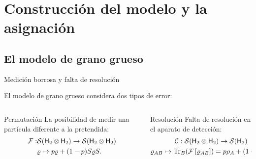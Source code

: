 \section{Construcción del modelo y la asignación}

\subsection{El modelo de grano grueso}
\begin{frame}{Medición borrosa y falta de resolución}
    \begin{center}
        El modelo de grano grueso considera dos tipos de error\pause:
    \end{center}
    \vspace{0.3cm}
    \begin{columns}
        \begin{column}{0.5\textwidth}
            \begin{block}{Permutación}
            \centering
            La posibilidad de medir una partícula diferente a la pretendida\pause:
            \begin{align}
                \mathcal{F}:&\mathcal{S}({\sf H}_2 \otimes {\sf H}_2)\to \mathcal{S}({\sf H}_2 \otimes {\sf H}_2)\nonumber\\
                &\varrho \mapsto p\varrho+(1-p)S\varrho S.\nonumber
            \end{align}
        \end{block}
        \end{column}
        \pause
        \begin{column}{0.5\textwidth}
            \begin{block}{Resolución}
            \centering
            Falta de resolución en el aparato de detección\pause:
            \begin{gather}
                \mcC:\mcS(\hilbert_2 \otimes \hilbert_2)\to \mcS(\hilbert_2)\pause\nonumber\\
                \varrho_{AB} \mapsto \Tr_{B}(\Fuzzy{\varrho_{AB}})\pause=p\rho_A+(1-p)\rho_B\rlap{,}\nonumber
            \end{gather}
        \end{block}
        \end{column}
    \end{columns}
\end{frame}
